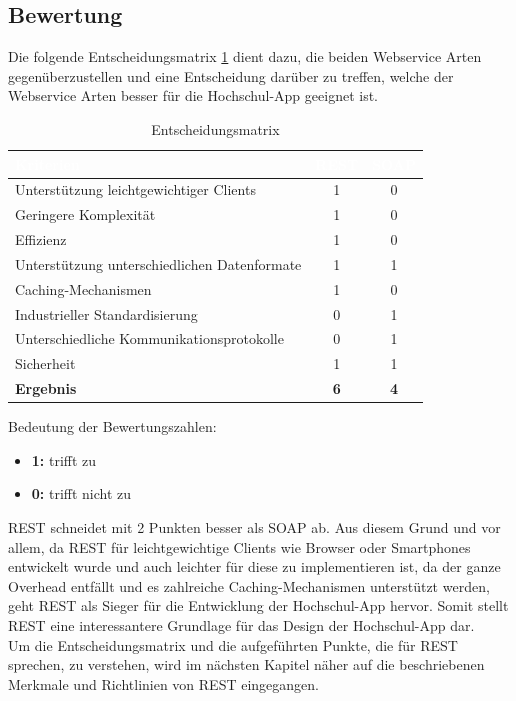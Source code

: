 \subsection{Bewertung}

Die folgende Entscheidungsmatrix \ref{tab:restvssoap} dient dazu, die beiden Webservice Arten gegenüberzustellen und eine Entscheidung darüber zu treffen, welche der Webservice Arten besser für die Hochschul-\ac{App} geeignet ist.

\begin{table}[H]
\begin{center}
  \begin{tabular}{| l | c | c |}
    \hline
    \rowcolor{Gray}
    \textcolor{white}{\textbf{Kriterien}} & \textcolor{white}{\textbf{REST}} & \textcolor{white}{\textbf{SOAP}} \\ \hline
    Unterstützung leichtgewichtiger Clients 		& 1 			& 0 \\
    \hline
\rowcolor{LGray}    
    Geringere Komplexität 						& 1 			& 0 \\
    \hline
    Effizienz			 						& 1 			& 0 \\
    \hline
    \rowcolor{LGray}
    Unterstützung unterschiedlichen Datenformate	& 1 			& 1 \\
    \hline
    Caching-Mechanismen	 						& 1 			& 0 \\
    \hline
    \rowcolor{LGray}
    Industrieller Standardisierung				& 0 			& 1 \\
    \hline
    Unterschiedliche Kommunikationsprotokolle		& 0 			& 1 \\
    \hline
    \rowcolor{LGray}
    Sicherheit			 						& 1 			& 1 \\
    \hline
   	\textbf{Ergebnis}							& \textbf{6}			& \textbf{4} \\
    	\hline
    	
  \end{tabular}
  \end{center}
\caption[Entscheidungsmatrix SOAP und REST]{Entscheidungsmatrix}
\label{tab:restvssoap}
\end{table}

Bedeutung der Bewertungszahlen: 
\begin{itemize}
\item \textbf{1:} trifft zu
\item \textbf{0:} trifft nicht zu
\end{itemize} 

\ac{REST} schneidet mit 2 Punkten besser als \ac{SOAP} ab. Aus diesem Grund und vor allem, da \ac{REST} für leichtgewichtige Clients wie Browser oder Smartphones entwickelt wurde und auch leichter für diese zu implementieren ist, da der ganze Overhead entfällt und es zahlreiche Caching-Mechanismen unterstützt werden, geht \ac{REST} als Sieger für die Entwicklung der Hochschul-\ac{App} hervor. Somit stellt \ac{REST} eine interessantere Grundlage für das Design der Hochschul-\ac{App} dar.
\\
\linebreak
Um die Entscheidungsmatrix und die aufgeführten Punkte, die für \ac{REST} sprechen, zu verstehen, wird im nächsten Kapitel näher  auf die beschriebenen Merkmale und Richtlinien von \ac{REST} eingegangen.